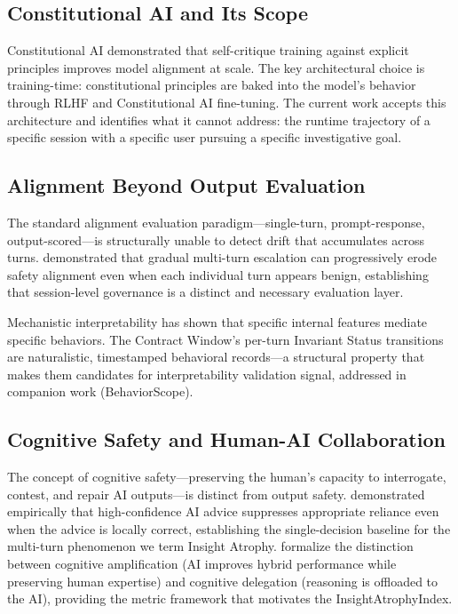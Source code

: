 \documentclass{article}
\newcommand{\cw}{Contract Window\xspace}
\newcommand{\ia}{Insight Atrophy\xspace}
\newcommand{\iai}{InsightAtrophyIndex\xspace}
\newcommand{\cai}{Constitutional AI\xspace}
\begin{document}
\subsection{Constitutional AI and Its Scope}

\cai{} \citep{bai2022constitutional} demonstrated that self-critique training
against explicit principles improves model alignment at scale. The key
architectural choice is training-time: constitutional principles are baked into
the model's behavior through RLHF and Constitutional AI fine-tuning. The
current work accepts this architecture and identifies what it cannot address:
the runtime trajectory of a specific session with a specific user pursuing a
specific investigative goal.

\subsection{Alignment Beyond Output Evaluation}

The standard alignment evaluation paradigm---single-turn, prompt-response,
output-scored---is structurally unable to detect drift that accumulates across
turns. \citet{russinovich2024crescendo} demonstrated that gradual multi-turn
escalation can progressively erode safety alignment even when each individual
turn appears benign, establishing that session-level governance is a distinct
and necessary evaluation layer.

Mechanistic interpretability \citep{elhage2022toy,
templeton2024scaling} has shown that specific internal features mediate
specific behaviors. The \cw{}'s per-turn Invariant Status transitions are
naturalistic, timestamped behavioral records---a structural property that makes
them candidates for interpretability validation signal, addressed in companion
work (BehaviorScope).

\subsection{Cognitive Safety and Human-AI Collaboration}

The concept of cognitive safety---preserving the human's capacity to
interrogate, contest, and repair AI outputs---is distinct from output safety.
\citet{schemmer2022appropriate} demonstrated empirically that high-confidence
AI advice suppresses appropriate reliance even when the advice is locally
correct, establishing the single-decision baseline for the multi-turn
phenomenon we term \ia. \citet{disanti2026cognitive} formalize the distinction
between cognitive amplification (AI improves hybrid performance while preserving
human expertise) and cognitive delegation (reasoning is offloaded to the AI),
providing the metric framework that motivates the \iai.
\end{document}
